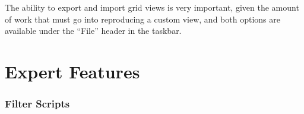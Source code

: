 \documentclass[]{article}
\begin{document}
The ability to export and import grid views is very important, given the amount of work that must go
into reproducing a custom view, and both options are available under the ``File'' header in the taskbar.

\newpage
\begin{figure}[h!]
    \vspace*{-2cm}
\end{figure}
\newpage

\part{Expert Features}
\label{sec:Expert Features}
\section{Filter Scripts}
\label{sec:Filter Scripts}
\end{document}
